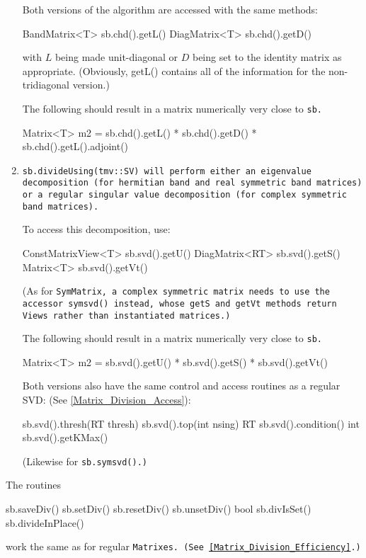 \begin{enumerate}
Both versions of the algorithm are accessed with the same methods:
\begin{tmvcode}
BandMatrix<T> sb.chd().getL()
DiagMatrix<T> sb.chd().getD()
\end{tmvcode}
with $L$ being made unit-diagonal or $D$ being set to the identity matrix
as appropriate.  (Obviously, getL() contains all of the information for the non-tridiagonal
version.)

The following should result in a matrix numerically very close to \tt{sb}.
\begin{tmvcode}
Matrix<T> m2 = sb.chd().getL() * sb.chd().getD() * 
      sb.chd().getL().adjoint()
\end{tmvcode}

\item
\tt{sb.divideUsing(tmv::SV)} will perform either an eigenvalue decomposition
(for hermitian band and real symmetric band matrices) or a regular singular value
decomposition (for complex symmetric band matrices).

To access this decomposition, use:
\begin{tmvcode}
ConstMatrixView<T> sb.svd().getU()
DiagMatrix<RT> sb.svd().getS()
Matrix<T> sb.svd().getVt()
\end{tmvcode}
(As for \tt{SymMatrix}, a complex symmetric matrix needs to use the accessor
\tt{symsvd()} instead, whose \tt{getS} and \tt{getVt} methods return Views
rather than instantiated matrices.)

The following should result in a matrix numerically very close to \tt{sb}.
\begin{tmvcode}
Matrix<T> m2 = sb.svd().getU() * sb.svd().getS() * sb.svd().getVt()
\end{tmvcode}

Both versions also have the same control and access routines as a regular SVD:
(See \ref{Matrix_Division_Access}):
\begin{tmvcode}
sb.svd().thresh(RT thresh)
sb.svd().top(int nsing)
RT sb.svd().condition()
int sb.svd().getKMax()
\end{tmvcode}
(Likewise for \tt{sb.symsvd()}.)

\end{enumerate}
The routines 
\begin{tmvcode}
sb.saveDiv()
sb.setDiv()
sb.resetDiv()
sb.unsetDiv()
bool sb.divIsSet()
sb.divideInPlace()
\end{tmvcode}
work the same as for regular \tt{Matrix}es.
(See \ref{Matrix_Division_Efficiency}.)

